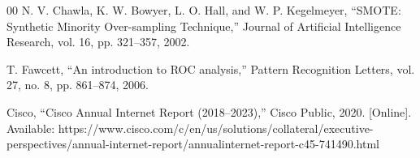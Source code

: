 \documentclass[conference]{IEEEtran}
\begin{document}
\begin{thebibliography}{00}
 N. V. Chawla, K. W. Bowyer, L. O. Hall, and W. P. Kegelmeyer, ``SMOTE: Synthetic Minority Over-sampling Technique,'' Journal of Artificial Intelligence Research, vol. 16, pp. 321--357, 2002.

 T. Fawcett, ``An introduction to ROC analysis,'' Pattern Recognition Letters, vol. 27, no. 8, pp. 861--874, 2006.

 Cisco, ``Cisco Annual Internet Report (2018–2023),'' Cisco Public, 2020. [Online]. Available: https://www.cisco.com/c/en/us/solutions/collateral/executive-perspectives/annual-internet-report/annualinternet-report-c45-741490.html

\end{thebibliography}
\end{document}
